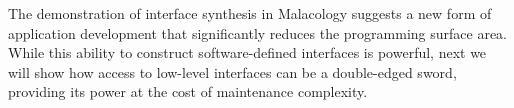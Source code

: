 The demonstration of interface synthesis in Malacology suggests a new form of
application development that significantly reduces the programming surface
area. While this ability to construct software-defined interfaces is powerful,
next we will show how access to low-level interfaces can be a double-edged
sword, providing its power at the cost of maintenance complexity.
